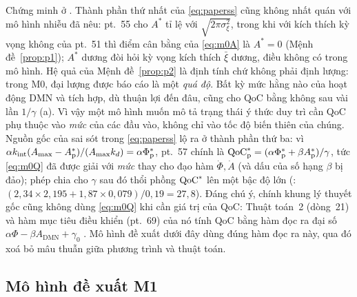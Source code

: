 Chứng minh ở . Thành phần thứ nhất của \eqref{eq:paperss} cũng không nhất quán với mô hình nhiễu đã nêu: pt.~55 cho $A^*$ tỉ lệ với $\sqrt{2\pi\sigma_\xi^2}$, trong khi với kích thích kỳ vọng không của pt.~51 thì điểm cân bằng của \eqref{eq:m0A} là $A^*=0$ (Mệnh đề~\ref{prop:p1}); $A^*$ dương đòi hỏi kỳ vọng kích thích $\bar\xi$ dương, điều không có trong mô hình. Hệ quả của Mệnh đề~\ref{prop:p2} là định tính chứ không phải định lượng: trong M0, đại lượng được báo cáo là một \emph{quá độ}. Bất kỳ mức hằng nào của hoạt động DMN và tích hợp, dù thuận lợi đến đâu, cũng cho QoC bằng không sau vài lần $1/\gamma$ (a). Vì vậy một mô hình muốn mô tả trạng thái ý thức duy trì cần QoC phụ thuộc vào \emph{mức} của các đầu vào, không chỉ vào tốc độ biến thiên của chúng. Nguồn gốc của sai sót trong \eqref{eq:paperss} lộ ra ở thành phần thứ ba: vì $\alpha k_{\mathrm{int}}(A_{\max}-A^*_{\mathrm p})/(A_{\max}k_{d})=\alpha\Phi^*_{\mathrm p}$, pt.~57 chính là $\mathrm{QoC}^*_{\mathrm p}=(\alpha\Phi^*_{\mathrm p}+\beta A^*_{\mathrm p})/\gamma$, tức \eqref{eq:m0Q} đã được giải với \emph{mức} thay cho đạo hàm $\dot\Phi,\dot A$ (và dấu của số hạng $\beta$ bị đảo); phép chia cho $\gamma$ sau đó thổi phồng $\mathrm{QoC}^*$ lên một bậc độ lớn (: $(2{,}34\times2{,}195+1{,}87\times0{,}079)/0{,}19=27{,}8$). Đáng chú ý, chính khung lý thuyết gốc cũng không dùng \eqref{eq:m0Q} khi cần giá trị của QoC: Thuật toán~2 (dòng~21) và hàm mục tiêu điều khiển (pt.~69) của nó tính QoC bằng hàm đọc ra đại số $\alpha\Phi-\beta A_{\mathrm{DMN}}+\gamma_0$ \citep{BQI}. Mô hình đề xuất dưới đây dùng đúng hàm đọc ra này, qua đó xoá bỏ mâu thuẫn giữa phương trình và thuật toán.

\subsection{Mô hình đề xuất M1}
\label{sec:m1}

